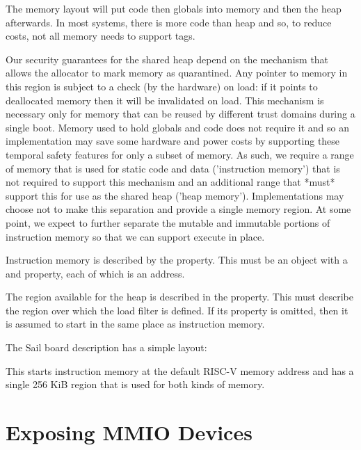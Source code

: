 The memory layout will put code then globals into memory and then the heap afterwards.
In most systems, there is more code than heap and so, to reduce costs, not all memory needs to support tags.

Our security guarantees for the shared heap depend on the mechanism that allows the allocator to mark memory as quarantined.
Any pointer to memory in this region is subject to a check (by the hardware) on load: if it points to deallocated memory then it will be invalidated on load.
This mechanism is necessary only for memory that can be reused by different trust domains during a single boot.
Memory used to hold globals and code does not require it and so an implementation may save some hardware and power costs by supporting these temporal safety features for only a subset of memory.
As such, we require a range of memory that is used for static code and data ('instruction memory') that is not required to support this mechanism and an additional range that *must* support this for use as the shared heap ('heap memory').
Implementations may choose not to make this separation and provide a single memory region.
At some point, we expect to further separate the mutable and immutable portions of instruction memory so that we can support execute in place.

Instruction memory is described by the  property.
This must be an object with a  and  property, each of which is an address.

The region available for the heap is described in the  property.
This must describe the region over which the load filter is defined.
If its  property is omitted, then it is assumed to start in the same place as instruction memory.

The Sail board description has a simple layout:

\begin{jsonsnippet}
    "instruction_memory": {
        "start": 0x80000000,
        "end": 0x80040000
    \},
    "heap": {
        "end": 0x80040000
    \},
\end{jsonsnippet}

This starts instruction memory at the default RISC-V memory address and has a single 256 KiB region that is used for both kinds of memory.

\section{Exposing MMIO Devices}

